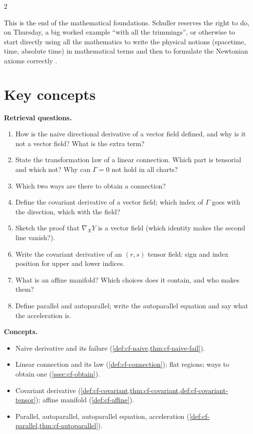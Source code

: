 \begin{paracol}{2}
\begin{secondary}
This is the end of the mathematical foundations. Schuller reserves the right to do, on Thursday, a big worked example ``with all
the trimmings'', or otherwise to start directly using all the mathematics to write the physical notions (spacetime, time, absolute time)
in mathematical terms and then to formulate the Newtonian axioms correctly .
\end{secondary}

\section*{Key concepts}
\begin{keyconcepts}
\textbf{Retrieval questions.}
\begin{enumerate}
  \item How is the naive directional derivative of a vector field defined, and why is it not a vector field? What is the extra term?
  \item State the transformation law of a linear connection. Which part is tensorial and which not? Why can $\Gamma=0$ not hold in all charts?
  \item Which two ways are there to obtain a connection?
  \item Define the covariant derivative of a vector field; which index of $\Gamma$ goes with the direction, which with the field?
  \item Sketch the proof that $\nabla_XY$ is a vector field (which identity makes the second line vanish?).
  \item Write the covariant derivative of an $(r,s)$ tensor field: sign and index position for upper and lower indices.
  \item What is an affine manifold? Which choices does it contain, and who makes them?
  \item Define parallel and autoparallel; write the autoparallel equation and say what the acceleration is.
\end{enumerate}
\textbf{Concepts.}
\begin{itemize}
  \item Naive derivative and its failure (\cref{def:cf-naive,thm:cf-naive-fail}).
  \item Linear connection and its law (\cref{def:cf-connection}); flat regions; ways to obtain one (\cref{ssec:cf-obtain}).
  \item Covariant derivative (\cref{def:cf-covariant,thm:cf-covariant,def:cf-covariant-tensor}); affine manifold (\cref{def:cf-affine}).
  \item Parallel, autoparallel, autoparallel equation, acceleration (\cref{def:cf-parallel,thm:cf-autoparallel}).
\end{itemize}
\end{keyconcepts}

\flushside
\end{paracol}
